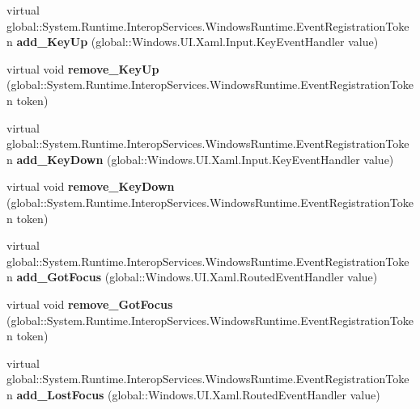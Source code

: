 \begin{DoxyCompactItemize}
virtual global\+::\+System.\+Runtime.\+Interop\+Services.\+Windows\+Runtime.\+Event\+Registration\+Token {\bfseries add\+\_\+\+Key\+Up} (global\+::\+Windows.\+U\+I.\+Xaml.\+Input.\+Key\+Event\+Handler value)
\item 
\mbox{\label{class_windows_1_1_u_i_1_1_xaml_1_1_u_i_element_a9b0df5770c1290041beafa550462cc33}} 
virtual void {\bfseries remove\+\_\+\+Key\+Up} (global\+::\+System.\+Runtime.\+Interop\+Services.\+Windows\+Runtime.\+Event\+Registration\+Token token)
\item 
\mbox{\label{class_windows_1_1_u_i_1_1_xaml_1_1_u_i_element_a58b82f2b844e4c525c9caa9f4dea423b}} 
virtual global\+::\+System.\+Runtime.\+Interop\+Services.\+Windows\+Runtime.\+Event\+Registration\+Token {\bfseries add\+\_\+\+Key\+Down} (global\+::\+Windows.\+U\+I.\+Xaml.\+Input.\+Key\+Event\+Handler value)
\item 
\mbox{\label{class_windows_1_1_u_i_1_1_xaml_1_1_u_i_element_a20e6427c1bb47624dae8e067c2fcf806}} 
virtual void {\bfseries remove\+\_\+\+Key\+Down} (global\+::\+System.\+Runtime.\+Interop\+Services.\+Windows\+Runtime.\+Event\+Registration\+Token token)
\item 
\mbox{\label{class_windows_1_1_u_i_1_1_xaml_1_1_u_i_element_acf97b246d988b08971b2521c2500b00b}} 
virtual global\+::\+System.\+Runtime.\+Interop\+Services.\+Windows\+Runtime.\+Event\+Registration\+Token {\bfseries add\+\_\+\+Got\+Focus} (global\+::\+Windows.\+U\+I.\+Xaml.\+Routed\+Event\+Handler value)
\item 
\mbox{\label{class_windows_1_1_u_i_1_1_xaml_1_1_u_i_element_a969ce3d1998e0289e2292ad1e208096f}} 
virtual void {\bfseries remove\+\_\+\+Got\+Focus} (global\+::\+System.\+Runtime.\+Interop\+Services.\+Windows\+Runtime.\+Event\+Registration\+Token token)
\item 
\mbox{\label{class_windows_1_1_u_i_1_1_xaml_1_1_u_i_element_ac2967b5f0d4bd33c16e3b3b32e19b01a}} 
virtual global\+::\+System.\+Runtime.\+Interop\+Services.\+Windows\+Runtime.\+Event\+Registration\+Token {\bfseries add\+\_\+\+Lost\+Focus} (global\+::\+Windows.\+U\+I.\+Xaml.\+Routed\+Event\+Handler value)

\end{DoxyCompactItemize}
